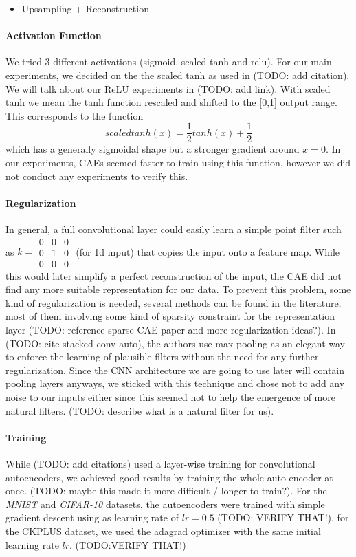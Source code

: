 \documentclass[draft]{article}
\begin{document}
    \begin{itemize}
      \item Upsampling + Reconstruction
    \end{itemize}

    \paragraph{Activation Function} We tried 3 different activations (sigmoid, scaled tanh and relu). For our main experiments, we decided on the the scaled tanh as used in (TODO: add citation). We will talk about our ReLU experiments in (TODO: add link). With scaled tanh we mean the tanh function rescaled and shifted to the [0,1] output range. This corresponds to the function $$scaledtanh(x) = \frac{1}{2}tanh(x) + \frac{1}{2}$$ which has a generally sigmoidal shape but a stronger gradient around $x = 0$. In our experiments, CAEs seemed faster to train using this function, however we did not conduct any experiments to verify this.

    \paragraph{Regularization} In general, a full convolutional layer could easily learn a simple point filter such as $k = \begin{smallmatrix} 0&0&0\\ 0&1&0 \\ 0&0&0 \end{smallmatrix}$ (for 1d input) that copies the input onto a feature map. While this would later simplify a perfect reconstruction of the input, the CAE did not find any more suitable representation for our data. To prevent this problem, some kind of regularization is needed, several methods can be found in the literature, most of them involving some kind of sparsity constraint for the representation layer (TODO: reference sparse CAE paper and more regularization ideas?). In (TODO: cite stacked conv auto), the authors use max-pooling as an elegant way to enforce the learning of plausible filters without the need for any further regularization. Since the CNN architecture we are going to use later will contain pooling layers anyways, we sticked with this technique and chose not to add any noise to our inputs either since this seemed not to help the emergence of more natural filters. (TODO: describe what is a natural filter for us). 

    \paragraph{Training} While (TODO: add citations) used a layer-wise training for convolutional autoencoders, we achieved good results by training the whole auto-encoder at once. (TODO: maybe this made it more difficult / longer to train?). For the \emph{MNIST} and \emph{CIFAR-10} datasets, the autoencoders were trained with simple gradient descent using as learning rate of $lr = 0.5$ (TODO: VERIFY THAT!), for the CKPLUS dataset, we used the adagrad optimizer with the same initial learning rate $lr$. (TODO:VERIFY THAT!)
\end{document}
